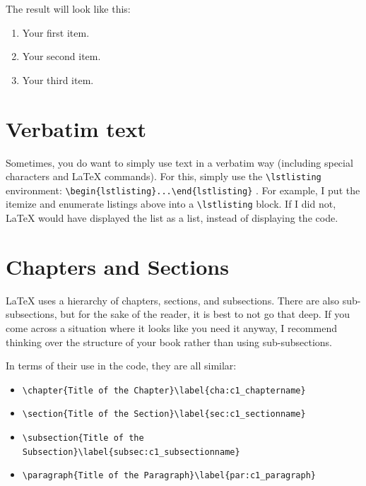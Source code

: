 The result will look like this:%
\begin{enumerate}
	\item Your first item.
	\item Your second item.
	\item Your third item.
\end{enumerate}


\section{Verbatim text}\label{sec:c1_verbatim}

Sometimes, you do want to simply use text in a verbatim way (including special
characters and \LaTeX{} commands). For this, simply use the
\lstinline[language=Tex]!\lstlisting! environment:
\lstinline[language=Tex]!\begin{lstlisting}...\end{lstlisting}!%
. For example, I put the itemize and enumerate listings above into a
\lstinline[language=Tex]!\lstlisting! block. If I did not, \LaTeX{} would have
displayed the list as a list, instead of displaying the code.



\section{Chapters and Sections}\label{sec:c1_chaptersandsections}

\LaTeX{} uses a hierarchy of chapters, sections, and subsections. There are also
sub-subsections, but for the sake of the reader, it is best to not go that deep.
If you come across a situation where it looks like you need it anyway, I
recommend thinking over the structure of your book rather than using
sub-subsections. 

In terms of their use in the code, they are all similar:

\begin{itemize}
    \item \lstinline[language=Tex]!\chapter{Title of the Chapter}\label{cha:c1_chaptername}!
    \item \lstinline[language=Tex]!\section{Title of the Section}\label{sec:c1_sectionname}!
    \item \lstinline[language=Tex]!\subsection{Title of the Subsection}\label{subsec:c1_subsectionname}!
    \item \lstinline[language=Tex]!\paragraph{Title of the Paragraph}\label{par:c1_paragraph}!
\end{itemize}

